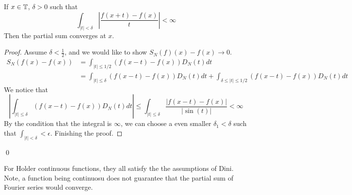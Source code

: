 \begin{theorem}
    If $x\in\mathbb{T}$, $\delta>0$ such that
    \begin{equation*}
        \int_{|t|<\delta}\left|\frac{f(x+t)-f(x)}{t} \right|<\infty
    \end{equation*}
    Then the partial sum converges at $x$.
\end{theorem}
\begin{proof}
    Assume $\delta<\frac{1}{2}$, and we would like to show $S_N(f)(x)-f(x)\to 0$.
    \begin{align*}
        S_N(f(x)-f(x))&=\int_{|t|\leq1/2}(f(x-t)-f(x))D_N(t)dt\\
        &=\int_{|t|\leq\delta}(f(x-t)-f(x))D_N(t)dt+\int_{\delta\leq|t|\leq1/2}(f(x-t)-f(x))D_N(t)dt
    \end{align*}
    We notice that
    \begin{equation*}
        \left|\int_{|t|\leq\delta}(f(x-t)-f(x))D_N(t)dt\right|\leq\int_{|t|\leq\delta}\frac{|f(x-t)-f(x)|}{|\sin(t)|}<\infty
    \end{equation*}
    By the condition that the integral is $\infty$, we can choose a even smaller $\delta_1<\delta$ such that $\int_{|t|<\delta}<\epsilon$. Finishing the proof.
\end{proof}
\qed

\begin{remark}
     For Holder continuous functions, they all satisfy the the assumptions of Dini. Note, a function being continuosu does not guarantee that the partial sum of Fourier series would converge.
\end{remark}


